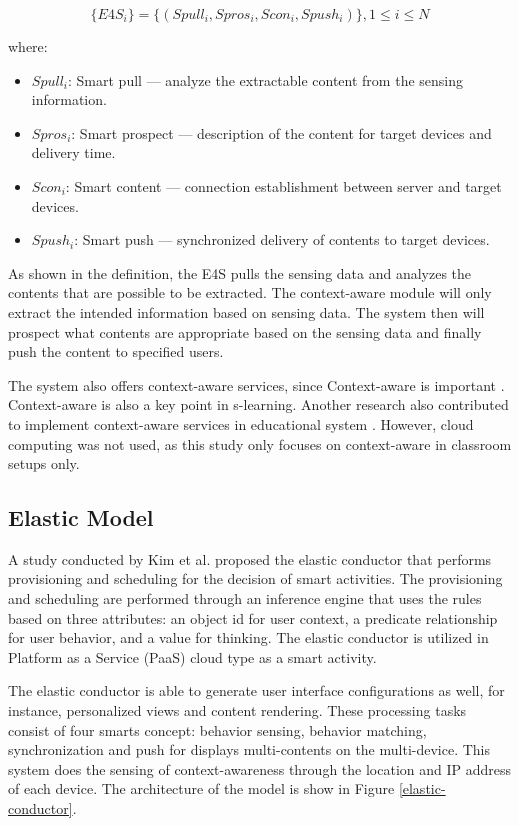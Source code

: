 \documentclass[journal]{vgtc}
\begin{document}
  \begin{equation}
    \{E4S_i\}=\{(Spull_i , Spros_i, Scon_i, Spush_i)\}, 1\leq i \leq N
  \end{equation}

  where:
  \begin{itemize}
  \setlength\itemsep{0em}
    \item[] $Spull_i$: Smart pull $—$ analyze the extractable content from the sensing information. 
    \item[] $Spros_i$: Smart prospect $—$ description of the content for target devices and delivery time.
    \item[] $Scon_i$: Smart content $—$ connection establishment between server and target devices.
    \item[] $Spush_i$: Smart push $—$ synchronized delivery of contents to target devices.
  \end{itemize}

  As shown in the definition, the E4S pulls the sensing data and analyzes the contents that are possible to be extracted. The context-aware module will only extract the intended information based on sensing data. The system then will prospect what contents are appropriate based on the sensing data and finally push the content to specified users.

  The system also offers context-aware services, since Context-aware is important \cite{Pratama2014}. Context-aware is also a key point in s-learning. Another research also contributed to implement context-aware services in educational system \cite{Scott2010}. However, cloud computing was not used, as this study only focuses on context-aware in classroom setups only.

  \subsection{Elastic Model}
  A study conducted by Kim et al. \cite{Kim2013} proposed the elastic conductor that performs provisioning and scheduling for the decision of smart activities. The provisioning and scheduling are performed through an inference engine that uses the rules based on three attributes: an object id for user context, a predicate relationship for user behavior, and a value for thinking. The elastic conductor is utilized in Platform as a Service (PaaS) cloud type as a smart activity.
  
  The elastic conductor is able to generate user interface configurations as well, for instance, personalized views and content rendering. These processing tasks consist of four smarts concept: behavior sensing, behavior matching, synchronization and push for displays multi-contents on the multi-device. This system does the  sensing of context-awareness through the location and IP address of each device. The architecture of the model is show in Figure \ref{elastic-conductor}.
\end{document}
